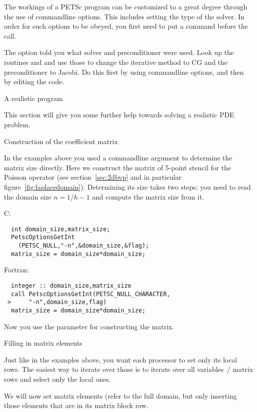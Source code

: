 The workings of a PETSc program can be customized to a great degree
through the use of commandline options. This includes setting the type
of the solver. In order for such options to be obeyed, you first need
to put a command  before the  call.

\begin{exercise}
  The  option told you what solver and preconditioner
  were used. Look up the routines  and  and
  use those to change the iterative method to CG and the
  preconditioner to Jacobi. Do this first by using commandline
  options, and then by editing the code.
\end{exercise}

 {A realistic program}

This section will give you some further help towards solving a
realistic \ac{PDE} problem.

 {Construction of the coefficient matrix}

In the examples above you used a commandline argument to determine the
matrix size directly.  Here we construct the matrix of 5-point stencil
for the Poisson operator (see section~\ref{sec:2dbvp} and in
particular figure~\ref{fig:laplacedomain}). Determining its size
takes two steps: you need to read the domain size $n=1/h-1$ and
compute the matrix size from it.

C:
\begin{verbatim}
  int domain_size,matrix_size;
  PetscOptionsGetInt
    (PETSC_NULL,"-n",&domain_size,&flag);
  matrix_size = domain_size*domain_size;
\end{verbatim}
Fortran:
\begin{verbatim}
  integer :: domain_size,matrix_size
  call PetscOptionsGetInt(PETSC_NULL_CHARACTER,
 >     "-n",domain_size,flag)
  matrix_size = domain_size*domain_size;
\end{verbatim}

Now you use the  parameter for constructing the matrix.

 {Filling in matrix elements}

Just like in the examples above, you want each processor to set only
its local rows. The easiest way to iterate over those is to iterate
over all variables~/ matrix rows and select only the local ones.

We will now set matrix elements (refer to
the full domain, but only inserting those elements that are in its
matrix block row.

